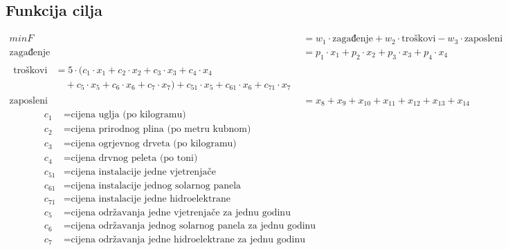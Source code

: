 \documentclass[12pt, a4paper]{paper}
\begin{document}
\subsection*{Funkcija cilja}
\begin{align*}
	min F &= w_1 \cdot \text{zagađenje} + w_2 \cdot \text{troškovi} - w_3 \cdot \text{zaposleni} \\
	\text{zagađenje} &= p_1 \cdot x_1 + p_2 \cdot x_2 + p_3 \cdot x_3 + p_4 \cdot x_4 \\
	\begin{split}
		\text{troškovi} &= 5 \cdot (c_1 \cdot x_1 + c_2 \cdot x_2 + c_3 \cdot x_3 + c_4 \cdot x_4 \\
		&\quad + c_5 \cdot x_5 + c_6 \cdot x_6 + c_7 \cdot x_7) + c_{51} \cdot x_5 + c_{61} \cdot x_6 + c_{71} \cdot x_7
	\end{split} \\
	\text{zaposleni} &= x_8 + x_9 + x_{10} + x_{11} + x_{12} + x_{13} + x_{14}
\end{align*}
\begin{align*}
	c_1 & = \text{cijena uglja (po kilogramu)} \\
	c_2 & = \text{cijena prirodnog plina (po metru kubnom)} \\
	c_3 & = \text{cijena ogrjevnog drveta (po kilogramu)} \\
	c_4 & = \text{cijena drvnog peleta (po toni)} \\
	c_{51} & = \text{cijena instalacije jedne vjetrenjače} \\
	c_{61} & = \text{cijena instalacije jednog solarnog panela} \\
	c_{71} & = \text{cijena instalacije jedne hidroelektrane} \\
	c_5 & = \text{cijena održavanja jedne vjetrenjače za jednu godinu} \\
	c_6 & = \text{cijena održavanja jednog solarnog panela za jednu godinu} \\
	c_7 & = \text{cijena održavanja jedne hidroelektrane za jednu godinu}
\end{align*}
\end{document}
